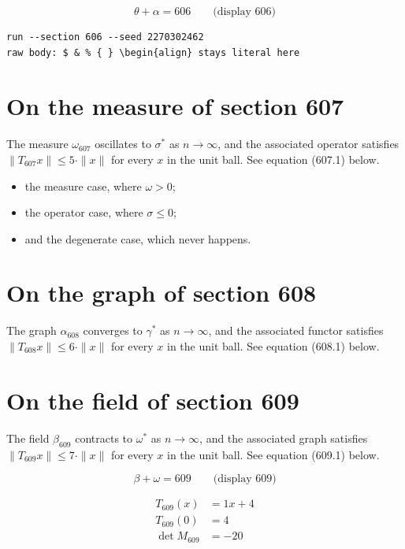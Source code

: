 \documentclass{article}
\begin{document}
$$
\theta + \alpha = 606 \qquad \text{(display 606)}
$$

\begin{verbatim}
run --section 606 --seed 2270302462
raw body: $ & % { } \begin{align} stays literal here
\end{verbatim}

\section{On the measure of section 607}
The measure $\omega_{607}$ oscillates to $\sigma^{*}$ as $n \to \infty$,
and the associated operator satisfies $\|T_{607} x\| \leq 5 \cdot \|x\|$
for every $x$ in the unit ball. See equation (607.1) below.

\begin{itemize}
  \item the measure case, where $\omega > 0$;
  \item the operator case, where $\sigma \leq 0$;
  \item and the degenerate case, which never happens.
\end{itemize}

\section{On the graph of section 608}
The graph $\alpha_{608}$ converges to $\gamma^{*}$ as $n \to \infty$,
and the associated functor satisfies $\|T_{608} x\| \leq 6 \cdot \|x\|$
for every $x$ in the unit ball. See equation (608.1) below.

\section{On the field of section 609}
The field $\beta_{609}$ contracts to $\omega^{*}$ as $n \to \infty$,
and the associated graph satisfies $\|T_{609} x\| \leq 7 \cdot \|x\|$
for every $x$ in the unit ball. See equation (609.1) below.

$$
\beta + \omega = 609 \qquad \text{(display 609)}
$$

\begin{align}
T_{609}(x) &= 1 x + 4 \\
T_{609}(0) &= 4 \\
\det M_{609} &= -20
\end{align}
\end{document}

